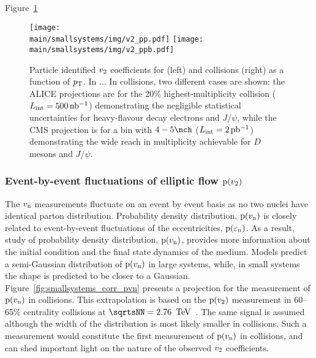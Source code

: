 \documentclass[../report.tex]{subfiles}
\providecommand{\main}{..}
\begin{document}
Figure~\ref{fig:smallsystems_corr_cumulants_pid}

\begin{figure}[ht]
\centering
\texttt{[image: \\main/smallsystems/img/v2\_pp.pdf]}
\hfill
\texttt{[image: \\main/smallsystems/img/v2\_ppb.pdf]}

\caption{Particle identified $v_{\rm{2}}$ coefficients for \pp (left) and \pPb collisions (right) as a function of $p\sb{\scriptstyle\mathrm{T}}$. In \pp... In \pPb collisions, two different cases are shown: the ALICE projections are for the 20\% highest-multiplicity collision ($L_{\rm int} = \unit[500]{nb^{-1}}$) demonstrating the negligible statistical uncertainties for heavy-flavour decay electrons and $J/\psi$, while the CMS projection is for a bin with $4-5 \nch$ ($L_{\rm int} = \unit[2]{pb^{-1}}$) demonstrating the wide reach in multiplicity achievable for $D$ mesons and $J/\psi$.
}
\label{fig:smallsystems_corr_cumulants_pid}
\end{figure}

\subsubsection{Event-by-event fluctuations of elliptic flow ${\rm p}(v_{\rm{2}})$}

The $v_{\rm{n}}$ measurements fluctuate on an event by event basis as no two nuclei have identical parton distribution. Probability density distribution, ${\rm p}(v_{\rm{n}})$ is closely related to event-by-event fluctuations of the eccentricities, ${\rm p}(\varepsilon_{\rm{n}})$. As a result, study of probability density distribution, ${\rm p}(v_{\rm{n}})$,  provides more information about the initial condition and the final state dynamics of the medium. Models predict a semi-Gaussian distribution of ${\rm p}(v_{\rm{n}})$ in large systems, while, in small systems the shape is predicted to be closer to a Gaussian. Figure~\ref{fig:smallsystems_corr_pvn} presents a projection for the measurement of ${\rm p}(v_{\rm{n}})$ in \pp collisions. This extrapolation is based on the ${\rm p}(v_{\rm{2}})$ measurement in 60--65\% centrality \PbPb collisions at $\sqrtsNN = \unit[2.76]{\UTeV}$~\cite{Aad:2013xma}. The same signal is assumed although the width of the distribution is most likely smaller in \pp collisions. Such a measurement would constitute the first measurement of ${\rm p}(v_{\rm{n}})$ in \pp collisions, and can shed important light on the nature of the observed $v_{\rm{2}}$ coefficients.
\end{document}

